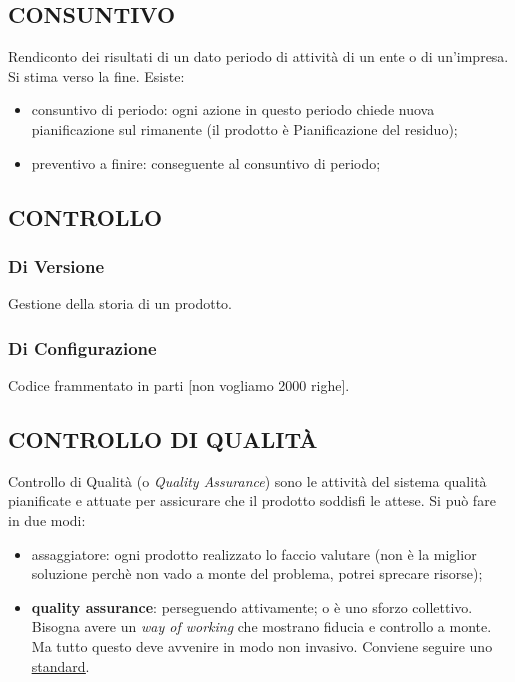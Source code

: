 		
		\subsection{CONSUNTIVO}  \label{consuntivo} 
		Rendiconto dei risultati di un dato periodo di attività di un ente o di un'impresa. Si stima verso la fine.
		Esiste:
			\begin{itemize}
				\item consuntivo di periodo: ogni azione in questo periodo chiede nuova pianificazione sul rimanente (il prodotto è Pianificazione del residuo);
				\item preventivo a finire: conseguente al consuntivo di periodo;
			\end{itemize}
		  
		
		\subsection{CONTROLLO}  \label{controllo}
			\subsubsection{Di Versione}  \label{controllodiversione}
			Gestione della storia di un prodotto.
			\subsubsection{Di Configurazione}  \label{controllodiconfigurazione}
			Codice frammentato in parti [non vogliamo 2000 righe].
			
			
		\subsection{CONTROLLO DI QUALITÀ}		\label{controlloqualita} %
		Controllo di Qualità (o \textit{Quality Assurance}) sono le attività del sistema qualità pianificate e attuate per assicurare che il prodotto soddisfi le attese. Si può fare in due modi:
		\begin{itemize}
			\item assaggiatore: ogni prodotto realizzato lo faccio valutare (non è la miglior soluzione perchè non vado a monte del problema, potrei sprecare risorse);
			\item \textbf{quality assurance}: perseguendo attivamente; o è uno sforzo collettivo. Bisogna avere un \textit{way of working} che mostrano fiducia e controllo a monte. Ma tutto questo deve avvenire in modo non invasivo. Conviene seguire uno \underline{\hyperref[standard]{standard}}.
		\end{itemize}	
		
